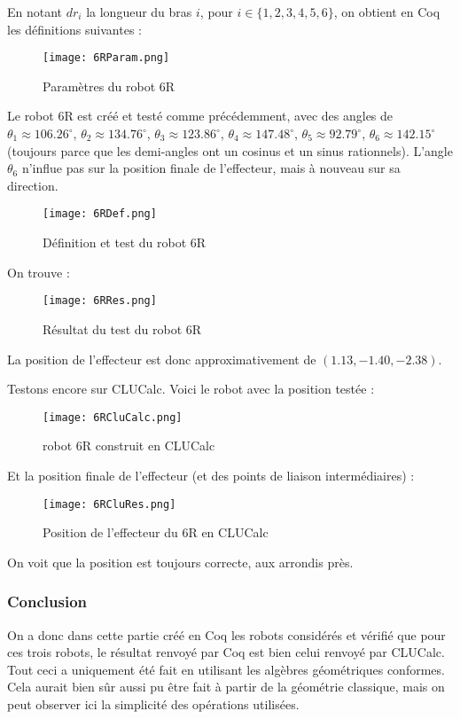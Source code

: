 En notant $dr_i$ la longueur du bras $i$, pour $i\in \lbrace 1,2,3, 4, 5, 6 \rbrace$, on obtient en Coq les définitions suivantes : 

\begin{figure}[!ht]
\centering
\texttt{[image: 6RParam.png]}
\caption{Paramètres du robot 6R}
\end{figure}
\newpage
Le robot 6R est créé et testé comme précédemment, avec des angles de $\theta_1 \approx 106.26 ^{\circ}$, $\theta_2 \approx 134.76 ^{\circ}$, $\theta_3 \approx 123.86^\circ$, $\theta_4 \approx 147.48^\circ$, $\theta_5 \approx 92.79^\circ$, $\theta_6 \approx 142.15^\circ$ (toujours parce que les demi-angles ont un cosinus et un sinus rationnels). L'angle $\theta_6$ n'influe pas sur la position finale de l'effecteur, mais à nouveau sur sa direction. 
\begin{figure}[!ht]
\centering
\texttt{[image: 6RDef.png]}
\caption{Définition et test du robot 6R}
\end{figure}

On trouve : 
\begin{figure}[!ht]
\centering
\texttt{[image: 6RRes.png]}
\caption{Résultat du test du robot 6R}
\end{figure}

La position de l'effecteur est donc approximativement de $(1.13, -1.40, -2.38)$.

Testons encore sur CLUCalc. Voici le robot avec la position testée : 

\begin{figure}[!ht]
\centering
\texttt{[image: 6RCluCalc.png]}
\caption{robot 6R construit en CLUCalc}
\end{figure}

Et la position finale de l'effecteur (et des points de liaison intermédiaires) :

\begin{figure}[!ht]
\centering
\texttt{[image: 6RCluRes.png]}
\caption{Position de l'effecteur du 6R en CLUCalc}
\end{figure}

On voit que la position est toujours correcte, aux arrondis près. 

\subsubsection{Conclusion }

On a donc dans cette partie créé en Coq les robots considérés et vérifié que pour ces trois robots, le résultat renvoyé par Coq est bien celui renvoyé par CLUCalc. Tout ceci a uniquement été fait en utilisant les algèbres géométriques conformes. Cela aurait bien sûr aussi pu être fait à partir de la géométrie classique, mais on peut observer ici la simplicité des opérations utilisées. 

